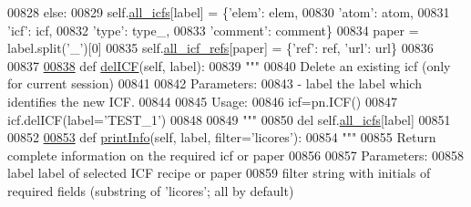 \begin{DoxyCode}
{{{00828         \textcolor{keywordflow}{else}:
00829             self.\hyperlink{classpyneb_1_1core_1_1icf_1_1_i_c_f_a854ee87a53feb102e429e902227ce88b}{all\_icfs}[label] = \{\textcolor{stringliteral}{'elem'}: elem,
00830                                     \textcolor{stringliteral}{'atom'}: atom,
00831                                     \textcolor{stringliteral}{'icf'}: icf,
00832                                     \textcolor{stringliteral}{'type'}: type\_,
00833                                     \textcolor{stringliteral}{'comment'}: comment\}
00834             paper = label.split(\textcolor{stringliteral}{'\_'})[0]
00835             self.\hyperlink{classpyneb_1_1core_1_1icf_1_1_i_c_f_a9777abc7cc843cd5c4d8c5810c1b2ed1}{all\_icf\_refs}[paper] = \{\textcolor{stringliteral}{'ref'}: ref, \textcolor{stringliteral}{'url'}: url\}
00836     
00837     
\hypertarget{icf_8py_source_l00838}{}\hyperlink{classpyneb_1_1core_1_1icf_1_1_i_c_f_a96966ef4b9dba4472c0d865b143b8240}{00838}     \textcolor{keyword}{def }\hyperlink{classpyneb_1_1core_1_1icf_1_1_i_c_f_a96966ef4b9dba4472c0d865b143b8240}{delICF}(self, label):
00839         \textcolor{stringliteral}{"""}
00840 \textcolor{stringliteral}{        Delete an existing icf (only for current session)}
00841 \textcolor{stringliteral}{        }
00842 \textcolor{stringliteral}{        Parameters:}
00843 \textcolor{stringliteral}{            - label    the label which identifies the new ICF. }
00844 \textcolor{stringliteral}{            }
00845 \textcolor{stringliteral}{        Usage:}
00846 \textcolor{stringliteral}{            icf=pn.ICF()}
00847 \textcolor{stringliteral}{            icf.delICF(label='TEST\_1')}
00848 \textcolor{stringliteral}{}
00849 \textcolor{stringliteral}{        """}
00850         del self.\hyperlink{classpyneb_1_1core_1_1icf_1_1_i_c_f_a854ee87a53feb102e429e902227ce88b}{all\_icfs}[label]
00851     
00852     
\hypertarget{icf_8py_source_l00853}{}\hyperlink{classpyneb_1_1core_1_1icf_1_1_i_c_f_a156850dec8c7457034434b3080c9a517}{00853}     \textcolor{keyword}{def }\hyperlink{classpyneb_1_1core_1_1icf_1_1_i_c_f_a156850dec8c7457034434b3080c9a517}{printInfo}(self, label, filter='licores'): 
00854         \textcolor{stringliteral}{""" }
00855 \textcolor{stringliteral}{        Return complete information on the required icf or paper}
00856 \textcolor{stringliteral}{        }
00857 \textcolor{stringliteral}{        Parameters:}
00858 \textcolor{stringliteral}{            label    label of selected ICF recipe or paper}
00859 \textcolor{stringliteral}{            filter   string with initials of required fields (substring of 'licores'; all by default)   }
}}}
\end{DoxyCode}

